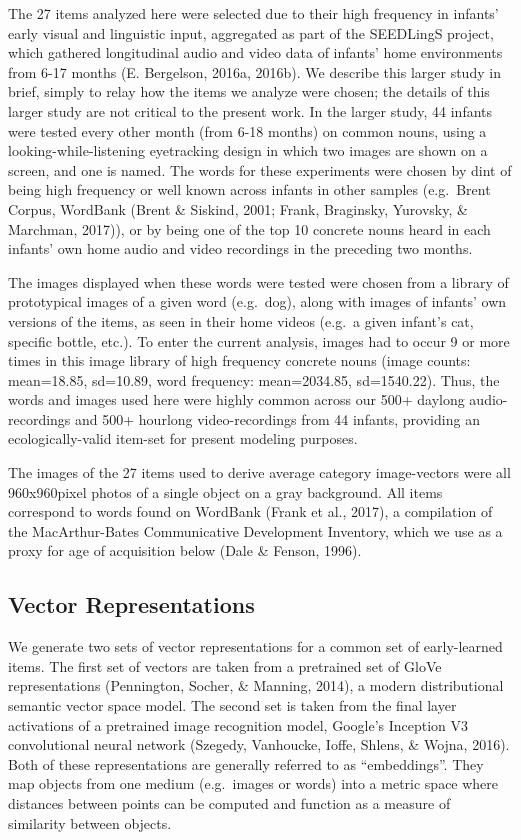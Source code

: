 \documentclass[10pt, letterpaper]{article}
\begin{document}
The 27 items analyzed here were selected due to their high frequency in
infants' early visual and linguistic input, aggregated as part of the
SEEDLingS project, which gathered longitudinal audio and video data of
infants' home environments from 6-17 months (E. Bergelson, 2016a,
2016b). We describe this larger study in brief, simply to relay how the
items we analyze were chosen; the details of this larger study are not
critical to the present work. In the larger study, 44 infants were
tested every other month (from 6-18 months) on common nouns, using a
looking-while-listening eyetracking design in which two images are shown
on a screen, and one is named. The words for these experiments were
chosen by dint of being high frequency or well known across infants in
other samples (e.g.~Brent Corpus, WordBank (Brent \& Siskind, 2001;
Frank, Braginsky, Yurovsky, \& Marchman, 2017)), or by being one of the
top 10 concrete nouns heard in each infants' own home audio and video
recordings in the preceding two months.

The images displayed when these words were tested were chosen from a
library of prototypical images of a given word (e.g.~dog), along with
images of infants' own versions of the items, as seen in their home
videos (e.g.~a given infant's cat, specific bottle, etc.). To enter the
current analysis, images had to occur 9 or more times in this image
library of high frequency concrete nouns (image counts: mean=18.85,
sd=10.89, word frequency: mean=2034.85, sd=1540.22). Thus, the words and
images used here were highly common across our 500+ daylong
audio-recordings and 500+ hourlong video-recordings from 44 infants,
providing an ecologically-valid item-set for present modeling purposes.

The images of the 27 items used to derive average category image-vectors
were all 960x960pixel photos of a single object on a gray background.
All items correspond to words found on WordBank (Frank et al., 2017), a
compilation of the MacArthur-Bates Communicative Development Inventory,
which we use as a proxy for age of acquisition below (Dale \& Fenson,
1996).

\subsection{Vector Representations}\label{vector-representations}

We generate two sets of vector representations for a common set of
early-learned items. The first set of vectors are taken from a
pretrained set of GloVe representations (Pennington, Socher, \& Manning,
2014), a modern distributional semantic vector space model. The second
set is taken from the final layer activations of a pretrained image
recognition model, Google's Inception V3 convolutional neural network
(Szegedy, Vanhoucke, Ioffe, Shlens, \& Wojna, 2016). Both of these
representations are generally referred to as ``embeddings''. They map
objects from one medium (e.g.~images or words) into a metric space where
distances between points can be computed and function as a measure of
similarity between objects.
\end{document}
